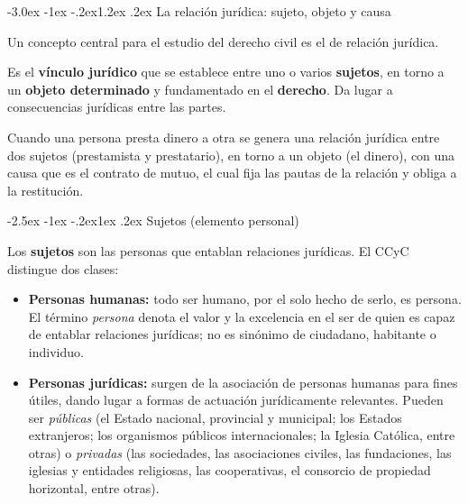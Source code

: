 \documentclass[12pt,oneside]{book}
\makeatletter
\renewcommand\section{\@startsection{section}{1}{\z@}%
  {-3.0ex \@plus -1ex \@minus -.2ex}{1.2ex \@plus .2ex}%
  {\normalfont\large\bfseries\color{acento}}}
\renewcommand\subsection{\@startsection{subsection}{2}{\z@}%
  {-2.5ex \@plus -1ex \@minus -.2ex}{1ex \@plus .2ex}%
  {\normalfont\normalsize\bfseries}}
\makeatother
\begin{document}
\section{La relación jurídica: sujeto, objeto y causa}

Un concepto central para el estudio del derecho civil es el de relación jurídica.

\begin{definicion}
Es el \textbf{vínculo jurídico} que se establece entre uno o varios \textbf{sujetos}, en torno a un \textbf{objeto determinado} y fundamentado en el \textbf{derecho}. Da lugar a consecuencias jurídicas entre las partes.
\end{definicion}

\begin{ejemplo}
Cuando una persona presta dinero a otra se genera una relación jurídica entre dos sujetos (prestamista y prestatario), en torno a un objeto (el dinero), con una causa que es el contrato de mutuo, el cual fija las pautas de la relación y obliga a la restitución.
\end{ejemplo}

\subsection{Sujetos (elemento personal)}

Los \textbf{sujetos} son las personas que entablan relaciones jurídicas. El CCyC distingue dos clases:

\begin{itemize}
\item \textbf{Personas humanas:} todo ser humano, por el solo hecho de serlo, es persona. El término \textit{persona} denota el valor y la excelencia en el ser de quien es capaz de entablar relaciones jurídicas; no es sinónimo de ciudadano, habitante o individuo.
\item \textbf{Personas jurídicas:} surgen de la asociación de personas humanas para fines útiles, dando lugar a formas de actuación jurídicamente relevantes. Pueden ser \textit{públicas} (el Estado nacional, provincial y municipal; los Estados extranjeros; los organismos públicos internacionales; la Iglesia Católica, entre otras) o \textit{privadas} (las sociedades, las asociaciones civiles, las fundaciones, las iglesias y entidades religiosas, las cooperativas, el consorcio de propiedad horizontal, entre otras).
\end{itemize}
\end{document}
